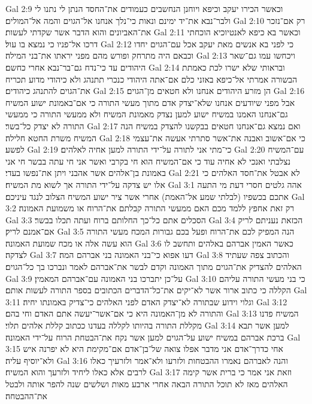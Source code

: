 Gal 2:9  וכאשר הכירו יעקב וכיפא ויוחנן הנחשבים כעמודים את־החסד הנתן לי נתנו לי ולבר־נבא את־יד ימינם ונאות כי־נלך אנחנו אל־הגוים והמה אל־המולים׃
Gal 2:10  רק אם־נזכר את־האביונים והוא הדבר אשר שקדתי לעשות׃
Gal 2:11  וכאשר בא כיפא לאנטיוכיא הוכחתי דרכו אל־פניו כי נמצא בו עול׃
Gal 2:12  כי לפני בא אנשים מאת יעקב אכל עם־הגוים יחדו וכבאם היה מתרחק ופורש מהם מפני יראתו את־בני המילה׃
Gal 2:13  ויכחשו עמו גם־שאר היהודים עד כי־נדח גם־בר־נבא אחרי כחשם׃
Gal 2:14  ובראותי שלא ישרו לכת כאמתת הבשורה אמרתי אל־כיפא באזני כלם אם־אתה היהודי כנכרי תתנהג ולא כיהודי מדוע תכריח את־הגוים להתנהג כיהודים׃
Gal 2:15  הן מזרע היהודים אנחנו ולא חטאים מן־הגוים׃
Gal 2:16  אבל מפני שיודעים אנחנו שלא־יצדק אדם מתוך מעשי התורה כי אם־באמונת ישוע המשיח גם־אנחנו האמנו במשיח ישוע למען נצדק מאמונת המשיח ולא ממעשי התורה כי ממעשי התורה לא יצדק כל־בשר׃
Gal 2:17  ואם נמצא גם־אנחנו חטאים בבקשנו להצדק במשיח הנה המשיח משרת החטא חלילה׃
Gal 2:18  כי אם־אשוב ואבנה את־אשר סתרתי אעשה את־עצמי לפשע׃
Gal 2:19  כי־מתי אני לתורה על־ידי התורה למען אחיה לאלהים׃
Gal 2:20  עם־המשיח נצלבתי ואנכי לא אחיה עוד כי אם־המשיח הוא חי בקרבי ואשר אני חי עתה בבשר חי אני באמונת בן־אלהים אשר אהבני ויתן את־נפשו בעדי׃
Gal 2:21  לא אבטל את־חסד האלהים כי אלו יש צדקה על־ידי התורה אך לשוא מת המשיח׃
Gal 3:1  אהה גלטים חסרי דעת מי התעה אתכם בכשפיו (לבלתי שמע אל־האמת) אחרי אשר ציר ישוע המשיח הצלוב לנגד עיניכם׃
Gal 3:2  רק זאת אחפץ ללמד מכם האם ממעשי התורה קבלתם את־הרוח או משמועת האמונה׃
Gal 3:3  הסכלים אתם כל־כך החלותם ברוח ועתה תכלו בבשר׃
Gal 3:4  הכזאת נעניתם לריק אם־אמנם לריק׃
Gal 3:5  הנה המפיק לכם את־הרוח ופעל בכם גבורות המכח מעשי התורה הוא עשה אלה או מכח שמועת האמונה׃
Gal 3:6  כאשר האמין אברהם באלהים ותחשב לו לצדקה׃
Gal 3:7  דעו אפוא כי־בני האמונה בני אברהם המה׃
Gal 3:8  והכתוב צפה שעתיד האלהים להצדיק את־הגוים מתוך האמונה וקדם לבשר את־אברהם לאמר ונברכו בך כל־הגוים׃
Gal 3:9  על־כן יתברכו בני האמונה עם־אברהם המאמין׃
Gal 3:10  כי בני מעשי התורה עליהם הקללה כי כתוב ארור אשר לא־יקים את־כל־הדברים הכתובים בספר התורה לעשות אותם׃
Gal 3:11  וגלוי וידוע שבתורה לא־יצדק האדם לפני האלהים כי־צדיק באמונתו יחיה׃
Gal 3:12  והתורה לא מן־האמונה היא כי אם־אשר־יעשה אתם האדם וחי בהם׃
Gal 3:13  המשיח פדנו מקללת התורה בהיותו לקללה בעדנו ככתוב קללת אלהים תלוי׃
Gal 3:14  למען אשר תבא ברכת אברהם במשיח ישוע על־הגוים למען אשר נקח את־הבטחת הרוח על־ידי האמונה׃
Gal 3:15  אחי כדרך־אדם אני מדבר אפלו צואה של־בן־אדם אם־מקימת היא לא יפרנה איש ולא־יוסיף עליה׃
Gal 3:16  והנה לאברהם נאמרו ההבטחות ולזרעו ולא־אמר ולזרעיך כאלו לרבים אלא כאלו ליחיד ולזרעך והוא המשיח׃
Gal 3:17  וזאת אני אמר כי ברית אשר קימה האלהים מאז לא תוכל התורה הבאה אחרי ארבע מאות ושלשים שנה להפר אותה ולבטל את־ההבטחה׃
